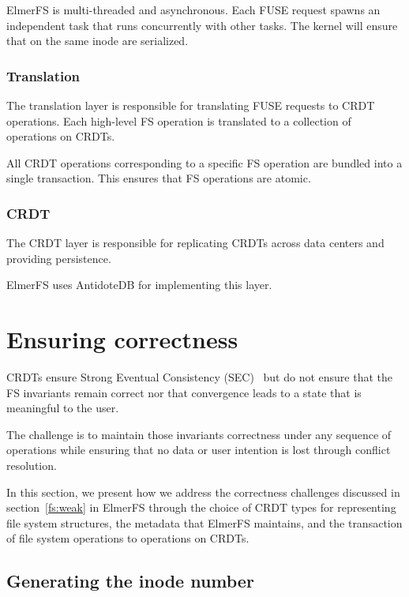 \documentclass[sigconf, anonymous, 10pt]{acmart}
\begin{document}
ElmerFS is multi-threaded and asynchronous. Each FUSE request spawns an independent task that runs concurrently with other tasks. The kernel will ensure that on the same inode
are serialized.

\subsubsection{Translation}
\label{sec:transaction_layer}
The translation layer is responsible for translating FUSE requests
to CRDT operations. Each high-level FS operation is translated
to a collection of operations on CRDTs.

All CRDT operations corresponding to a specific FS operation are bundled into
a single transaction. This ensures that FS operations are atomic.

\subsubsection{CRDT}

The CRDT layer is responsible for replicating CRDTs across data centers
and providing persistence.

ElmerFS uses AntidoteDB for implementing this layer.

\section{Ensuring correctness}

CRDTs ensure Strong Eventual Consistency (SEC)~\cite{shapiro2011conflict} but
do not ensure that the FS invariants remain correct
nor that convergence leads to a state that is meaningful
to the user.

The challenge is to maintain those invariants correctness under any sequence
of operations while ensuring that no data or user intention is lost through
conflict resolution.

In this section, we present how we address the correctness challenges discussed in section~\ref{fs:weak}
in ElmerFS through the choice of CRDT types for representing file system structures,
the metadata that ElmerFS maintains, and the transaction of file system operations
to operations on CRDTs.

\subsection{Generating the inode number}
\label{sec:generation_inode_number}
\end{document}
